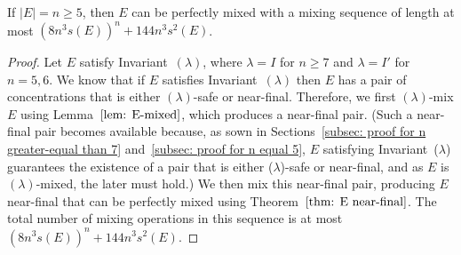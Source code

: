 
\begin{theorem} \label{thm: perfect mixability upper bound}
	If $|E|=n\geq 5$, then $E$ can be perfectly mixed with a mixing sequence of length at most
	$(8n^3s(E))^n + 144n^3s^2(E)$.
\end{theorem}

\begin{proof}
	Let $E$ satisfy Invariant~$(\lambda)$, where $\lambda = I$ for $n\ge 7$ and $\lambda = I'$ for $n = 5,6$.
	We know that if $E$ satisfies Invariant~$(\lambda)$	then $E$ has a pair of concentrations
	that is either $(\lambda)$-safe or near-final. 
	Therefore, we first $(\lambda)$-mix $E$ using Lemma~$\ref{lem: E-mixed}$, 
	which produces a near-final pair.
	(Such a near-final pair becomes available because, as sown in
	Sections~\ref{subsec: proof for n greater-equal than 7}	and~\ref{subsec: proof for n equal 5},
	$E$ satisfying Invariant~($\lambda$) guarantees the existence of a pair that is either ($\lambda$)-safe
	or near-final, and as $E$ is $(\lambda)$-mixed, the later must hold.)
	We then mix this near-final pair, producing $E$ near-final 
	that can be perfectly mixed using Theorem~$\ref{thm: E near-final}$.	
	The total number of mixing operations in this sequence is at most $(8n^3s(E))^n + 144n^3s^2(E)$.
\end{proof}
